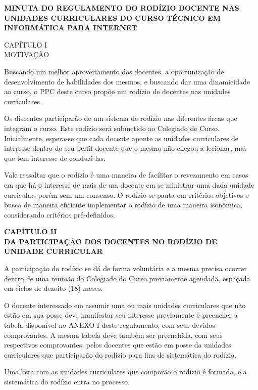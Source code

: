 \documentclass[
	12pt,				%
	openright,			%
	twoside,			%
	a4paper,			%
	chapter=TITLE,		%
	english,			%
	french,				%
	spanish,			%
	brazil,				%
	]{abntex2}
\begin{document}
\begin{anexos}

\begin{center}\bfseries
	MINUTA DO REGULAMENTO DO RODÍZIO DOCENTE NAS UNIDADES CURRICULARES DO CURSO TÉCNICO EM INFORMÁTICA PARA INTERNET
	\vspace{2em}
	\par 
	CAPÍTULO I
	\\
	MOTIVAÇÃO
	
\end{center}


Buscando um melhor aproveitamento dos docentes, a oportunização de desenvolvimento de habilidades dos mesmos, e buscando dar uma dinamicidade ao curso, o PPC deste curso propõe um rodízio de docentes nas unidades curriculares.

Os discentes participarão de um sistema de rodízio nas diferentes áreas que integram o curso. Este rodízio  será  submetido ao Colegiado de Curso.  Inicialmente, espera-se que cada docente aponte as unidades curriculares de interesse dentro do seu perfil docente que o mesmo não chegou a lecionar, mas que tem interesse de conduzi-las. 

Vale ressaltar que o rodízio é uma maneira de facilitar o revezamento em casos em que há o interesse de mais de um docente em se ministrar uma dada unidade curricular, porém sem um consenso. O rodízio se pauta em critérios objetivos e busca de maneira eficiente implementar o rodízio de uma maneira isonômica, considerando critérios pré-definidos.


\begin{center}\bfseries
	CAPÍTULO II
	\\
	DA PARTICIPAÇÃO DOS DOCENTES NO RODÍZIO DE UNIDADE CURRICULAR
	
\end{center}

A participação do rodízio se dá de forma voluntária e a mesma precisa ocorrer dentro de uma reunião do Colegiado do Curso previamente agendada, espaçada em ciclos de dezoito (18) meses. 


O docente interessado em assumir uma ou mais unidades curriculares que não estão em sua posse deve manifestar seu interesse previamente e preencher a tabela  disponível no ANEXO I deste regulamento, com seus devidos comprovantes. A mesma tabela deve também ser preenchida, com seus respectivos comprovantes, pelos docentes que estão em posse da unidades curriculares que participarão do rodízio  para fins de sistemática do rodízio.

Uma lista com as unidades curriculares que comporão o rodízio é formada, e a sistemática do rodízio entra no processo.



\end{anexos}
\end{document}

